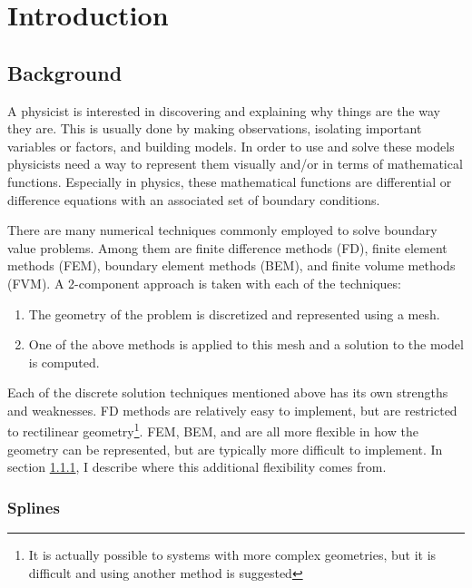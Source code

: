 \section{Introduction} \label{sec:Intro}

  \subsection{Background} \label{ssec:background}

    A physicist is interested in discovering and explaining why things are the way they are. This is usually done by making observations, isolating important variables or factors, and building models. In order to use and solve these models physicists need a way to represent them visually and/or in terms of mathematical functions. Especially in physics, these mathematical functions are differential or difference equations with an associated set of boundary conditions.

    There are many numerical techniques commonly employed to solve boundary value problems. Among them are finite difference methods (FD), finite element methods (FEM), boundary element methods (BEM), and finite volume methods (FVM). A 2-component approach is taken with each of the techniques:

    \begin{enumerate}[1)]
      \item The geometry of the problem is discretized and represented using a mesh.
      \item One of the above methods is applied to this mesh and a solution to the model is computed.
    \end{enumerate}
    \mainstretch

    Each of the discrete solution techniques mentioned above has its own strengths and weaknesses. FD methods are relatively easy to implement, but are restricted to rectilinear geometry\footnote{It is actually possible to systems with more complex geometries, but it is difficult and using another method is suggested}. FEM, BEM, and are all more flexible in how the geometry can be represented, but are typically more difficult to implement. In section \ref{ssub:splines}, I describe where this additional flexibility comes from.

    \subsubsection{Splines} \label{ssub:splines}

